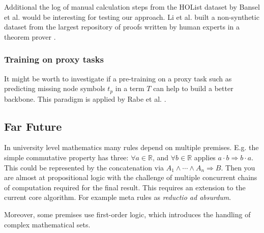 \documentclass{scrartcl}
\theoremstyle{definition}
\begin{document}
Additional the log of manual calculation steps from the HOList dataset by Bansel et al. \cite{kaliszyk2017holstep} would be interesting for testing our approach.
Li et al. built a non-synthetic dataset from the largest repository of proofs written by human experts in a theorem prover \cite{li2021isarstep}.

\subsubsection{Training on proxy tasks}

It might be worth to investigate if a pre-training on a proxy task such as predicting missing node symbols $t_p$ in a term $T$ can help to build a better backbone.
This paradigm is applied by Rabe et al. \cite{rabe2020mathematical}.

\subsection{Far Future}

In university level mathematics many rules depend on multiple premises.
E.g. the simple commutative property has three: $\forall a \in \mathbb{R}$, and $\forall b \in \mathbb{R}$ applies $a\cdot b \Longrightarrow b\cdot a$.
This could be represented by the concatenation via $A_1 \wedge \cdots \wedge A_n \Longrightarrow B$.
Then you are almost at propositional logic with the challenge of multiple concurrent chains of computation required for the final result.
This requires an extension to the current core algorithm. For example meta rules as \textit{reductio ad absurdum}.

Moreover, some premises use first-order logic, which introduces the handling of complex mathematical sets.


\printbibliography
\end{document}
